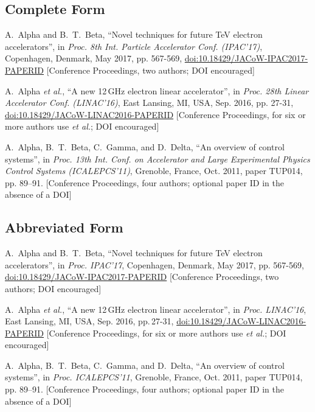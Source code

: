 \subsection{Complete Form}

\newcommand{\CCom}[2]{\newline\textcolor{#1}{[#2]}}
\begin{thebibliography}{9} %
	
	A.~Alpha and B.~T.~Beta, “Novel techniques for future TeV electron accelerators”,
	in \textit{Proc. 8th Int. Particle Accelerator Conf. (IPAC’17)},
	Copenhagen, Denmark, May 2017, 
	pp. 567-569, \url{doi:10.18429/JACoW-IPAC2017-PAPERID}
	\CCom{jgreen}{Conference Proceedings, two authors; DOI encouraged}

	A.~Alpha \emph{et al.},
	“A new 12\,GHz electron linear accelerator”,
	in \emph{Proc. 28th Linear Accelerator Conf. (LINAC’16)},
	East Lansing, MI, USA, Sep. 2016, pp. 27-31, \newline
	\url{doi:10.18429/JACoW-LINAC2016-PAPERID}
	\CCom{jgreen}{Conference Proceedings, for six or more authors use \emph{et al.};	
		 DOI encouraged}
	
	A.~Alpha, B.~T.~Beta, C.~Gamma, and D.~Delta,
	“An overview of control systems”,
	in \emph{Proc. 13th Int. Conf. on Accelerator and Large Experimental Physics Control Systems (ICALEPCS’11)}, Grenoble, France, Oct. 2011,
	paper TUP014, pp. 89--91.
	\CCom{jgreen}{Conference Proceedings, four authors; optional paper ID
	in the absence of a DOI}
\end{thebibliography}

\vspace*{-.5\baselineskip}
\subsection{Abbreviated Form}

\begin{thebibliography}{9} %
	A.~Alpha and B.~T.~Beta, “Novel techniques for future TeV electron accelerators”,
	in \textit{Proc. IPAC’17}, Copenhagen, Denmark, May 2017, 
	pp. 567-569, \newline
	\url{doi:10.18429/JACoW-IPAC2017-PAPERID}
	\CCom{jgreen}{Conference Proceedings, two authors; DOI encouraged}
	
	A.~Alpha \emph{et al.},
	“A new 12\,GHz electron linear accelerator”,
	in \emph{Proc. LINAC’16},
	East Lansing, MI, USA, Sep. 2016, pp.\,27-31, 
	\url{doi:10.18429/JACoW-LINAC2016-PAPERID}
	\CCom{jgreen}{Conference Proceedings, for six or more authors use \emph{et al.};	
		 		  DOI encouraged}
	
	A.~Alpha, B.~T.~Beta, C.~Gamma, and D.~Delta,
	“An overview of control systems”,
	in \emph{Proc. ICALEPCS’11}, Grenoble, France, Oct. 2011,
	paper TUP014, pp. 89--91.
	\CCom{jgreen}{Conference Proceedings, four authors; optional paper ID
				  in the absence of a DOI}
\end{thebibliography}

